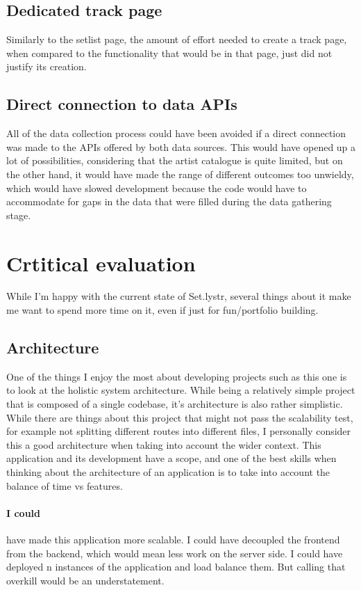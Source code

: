 \documentclass[10pt, a4paper]{article}
\begin{document}
        \subsection{Dedicated track page}
        Similarly to the setlist page, the amount of effort needed to create a track page, when compared to the functionality that would be in that page, just did not justify its creation. 

        \subsection{Direct connection to data APIs}
        All of the data collection process could have been avoided if a direct connection was made to the APIs offered by both data sources. This would have opened up a lot of possibilities, considering that the artist catalogue is quite limited, but on the other hand, it would have made the range of different outcomes too unwieldy, which would have slowed development because the code would have to accommodate for gaps in the data that were filled during the data gathering stage.

        \section{Crtitical evaluation}
        While I'm happy with the current state of Set.lystr, several things about it make me want to spend more time on it, even if just for fun/portfolio building.

        \subsection{Architecture}
        One of the things I enjoy the most about developing projects such as this one is to look at the holistic  system architecture. While being a relatively simple project that is composed of a single codebase, it's architecture is also rather simplistic. While there are things about this project that might not pass the scalability test, for example not splitting different routes into different files, I personally consider this a good architecture when taking into account the wider context. This application and its development have a scope, and one of the best skills when thinking about the architecture of an application is to take into account the balance of time vs features.
        \paragraph{I could} have made this application more scalable. I could have decoupled the frontend from the backend, which would mean less work on the server side. I could have deployed n instances of the application and load balance them. But calling that overkill would be an understatement.
\end{document}

